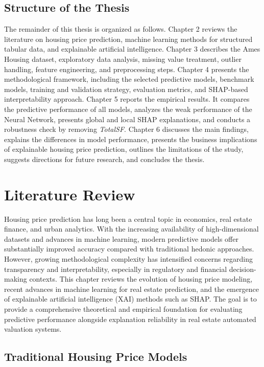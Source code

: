\documentclass[12pt,a4paper,oneside,openany]{book}
\begin{document}
\section{Structure of the Thesis}

The remainder of this thesis is organized as follows. Chapter 2 reviews the literature on housing price prediction, machine learning methods for structured tabular data, and explainable artificial intelligence. Chapter 3 describes the Ames Housing dataset, exploratory data analysis, missing value treatment, outlier handling, feature engineering, and preprocessing steps. Chapter 4 presents the methodological framework, including the selected predictive models, benchmark models, training and validation strategy, evaluation metrics, and SHAP-based interpretability approach. Chapter 5 reports the empirical results. It compares the predictive performance of all models, analyzes the weak performance of the Neural Network, presents global and local SHAP explanations, and conducts a robustness check by removing \textit{TotalSF}. Chapter 6 discusses the main findings, explains the differences in model performance, presents the business implications of explainable housing price prediction, outlines the limitations of the study, suggests directions for future research, and concludes the thesis.



\chapter{Literature Review}

Housing price prediction has long been a central topic in economics, real estate finance, and urban analytics. With the increasing availability of high-dimensional datasets and advances in machine learning, modern predictive models offer substantially improved accuracy compared with traditional hedonic approaches. However, growing methodological complexity has intensified concerns regarding transparency and interpretability, especially in regulatory and financial decision-making contexts. This chapter reviews the evolution of housing price modeling, recent advances in machine learning for real estate prediction, and the emergence of explainable artificial intelligence (XAI) methods such as SHAP. The goal is to provide a comprehensive theoretical and empirical foundation for evaluating predictive performance alongside explanation reliability in real estate automated valuation systems.

\section{Traditional Housing Price Models}
\end{document}
